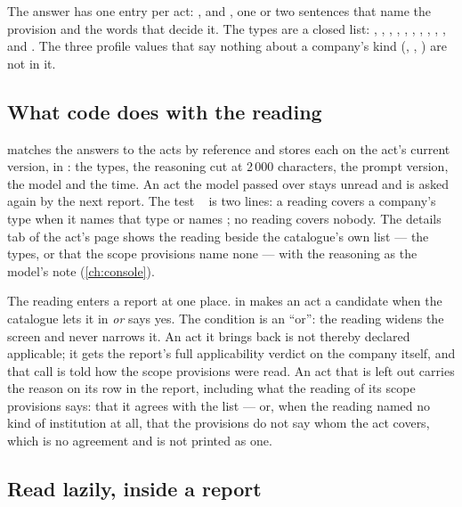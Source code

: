 The answer has one entry per act: ,  and
, one or two sentences that name the provision and the words that decide it.
The types are a closed list: , , ,
, , , ,
, , ,
 and . The three profile values that say nothing about a company's
kind (, , ) are not in it.

\subsection{What code does with the reading}

 matches the answers to the acts by reference and stores each on the act's
current version, in : the types, the reasoning cut at
2\,000 characters, the prompt version, the model and the time. An act the model passed over
stays unread and is asked again by the next report. The test ~ is
two lines: a reading covers a company's type when it names that type or names ; no
reading covers nobody. The details tab of the act's page shows the reading beside the
catalogue's own list --- the types, or that the scope provisions name none --- with the
reasoning as the model's note (\cref{ch:console}).

The reading enters a report at one place.  in
 makes an act a candidate when the catalogue lets it in \emph{or}
 says yes. The condition is an \enquote{or}: the reading widens the screen and
never narrows it. An act it brings back is not thereby declared applicable; it gets the
report's full applicability verdict on the company itself, and that call is told how the
scope provisions were read. An act that is left out carries the reason on its row in the
report, including what the reading of its scope provisions says: that it agrees with the
list --- or, when the reading named no kind of institution at all, that the provisions do not
say whom the act covers, which is no agreement and is not printed as one.

\subsection{Read lazily, inside a report}

